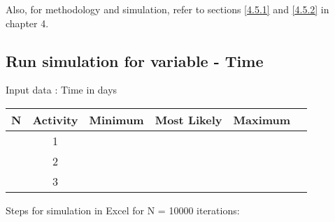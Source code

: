 Also, for methodology and simulation, refer to sections \ref{4.5.1} and \ref{4.5.2} in chapter 4. 

\subsection{Run simulation for variable - Time}
Input data : Time in days 

\begin{center}
	\begin{tabular}{ |c|c|c|c|c| c|} 
		\hline
		N&Activity & Minimum & Most Likely & Maximum\\
		\hline
		&1 & &  & \\ 
		\hline
		&2 & & &\\ 
		\hline
		&3& & &\\ 
		\hline
	\end{tabular}\label{table1}	
\end{center}

Steps for simulation in Excel for N = 10000 iterations:

